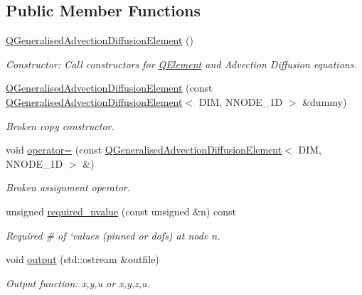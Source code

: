 \subsection*{Public Member Functions}
\begin{DoxyCompactItemize}
\item 
\hyperlink{classoomph_1_1QGeneralisedAdvectionDiffusionElement_ac856e8a06e73d469496339fa6ce8f9dc}{Q\+Generalised\+Advection\+Diffusion\+Element} ()
\begin{DoxyCompactList}\small\item\em Constructor\+: Call constructors for \hyperlink{classoomph_1_1QElement}{Q\+Element} and Advection Diffusion equations. \end{DoxyCompactList}\item 
\hyperlink{classoomph_1_1QGeneralisedAdvectionDiffusionElement_ad1fa7ad00ed45c96e176f320343d1813}{Q\+Generalised\+Advection\+Diffusion\+Element} (const \hyperlink{classoomph_1_1QGeneralisedAdvectionDiffusionElement}{Q\+Generalised\+Advection\+Diffusion\+Element}$<$ D\+IM, N\+N\+O\+D\+E\+\_\+1D $>$ \&dummy)
\begin{DoxyCompactList}\small\item\em Broken copy constructor. \end{DoxyCompactList}\item 
void \hyperlink{classoomph_1_1QGeneralisedAdvectionDiffusionElement_a6bbdccb49534c23105b563343fb3c78c}{operator=} (const \hyperlink{classoomph_1_1QGeneralisedAdvectionDiffusionElement}{Q\+Generalised\+Advection\+Diffusion\+Element}$<$ D\+IM, N\+N\+O\+D\+E\+\_\+1D $>$ \&)
\begin{DoxyCompactList}\small\item\em Broken assignment operator. \end{DoxyCompactList}\item 
unsigned \hyperlink{classoomph_1_1QGeneralisedAdvectionDiffusionElement_acd259476019fc5a54a1925777527bd38}{required\+\_\+nvalue} (const unsigned \&n) const
\begin{DoxyCompactList}\small\item\em Required \# of `values\textquotesingle{} (pinned or dofs) at node n. \end{DoxyCompactList}\item 
void \hyperlink{classoomph_1_1QGeneralisedAdvectionDiffusionElement_adcbd395387f1665caeede9ee8020a8cc}{output} (std\+::ostream \&outfile)
\begin{DoxyCompactList}\small\item\em Output function\+: x,y,u or x,y,z,u. \end{DoxyCompactList}\item 

\end{DoxyCompactItemize}
